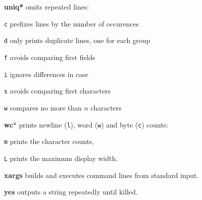 \textbf{uniq*} omits repeated lines:
\begin{enumx}
	\item [\texttt{c}] prefixes lines by the number of occurences
	\item [\texttt{d}] only prints duplicate lines, one for each group
	\item [\texttt{f}] avoids comparing first fields
	\item [\texttt{i}] ignores differences in case
	\item [\texttt{s}] avoids comparing first characters
	\item [\texttt{w}] compares no more than $n$ characters
\end{enumx}


\textbf{wc}* prints newline (\texttt{l}), word (\texttt{w}) and byte (\texttt{c}) counts:
\begin{enumx}
	\item [\texttt{m}] prints the character counts,
	\item [\texttt{L}] prints the maximum display width.
\end{enumx}

\textbf{xargs} builds and executes command lines from standard input.

\textbf{yes} outputs a string repeatedly until killed.
